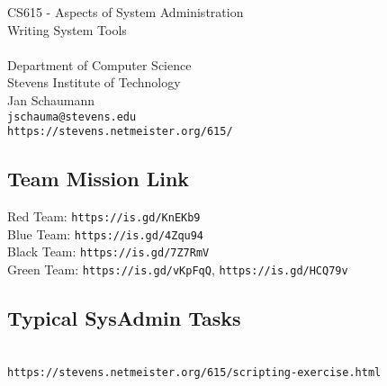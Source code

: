 \documentclass[xga]{xdvislides}
\begin{document}
\setfontphv

\lhead{\slidetitle}                               %
\cfoot{\relax}                               %
\rfoot{\Gray{\today}}

\vspace*{\fill}
\begin{center}
	\Hugesize
		CS615 - Aspects of System Administration\\ [1em]
		Writing System Tools\\ [1em]

	\hspace*{5mm}\blueline\\ [1em]
	\Normalsize
		Department of Computer Science\\
		Stevens Institute of Technology\\
		Jan Schaumann\\
		\verb+jschauma@stevens.edu+\\
		\verb+https://stevens.netmeister.org/615/+
\end{center}
\vspace*{\fill}

\subsection{Team Mission Link}
Red Team: \verb+https://is.gd/KnEKb9+ \\

\vspace{.5in}
Blue Team: \verb+https://is.gd/4Zqu94+ \\

\vspace{.5in}
Black Team: \verb+https://is.gd/7Z7RmV+ \\

\vspace{.5in}
Green Team: \verb+https://is.gd/vKpFqQ+, \verb+https://is.gd/HCQ79v+

\subsection{Typical SysAdmin Tasks}
\\

\vspace{.5in}
\verb+https://stevens.netmeister.org/615/scripting-exercise.html+
\end{document}
